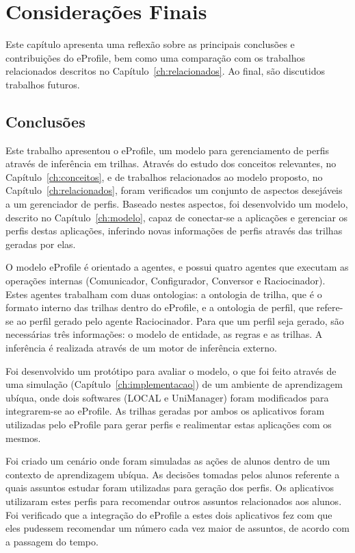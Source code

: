 \chapter{Considerações Finais}
\label{ch:consideracoes}

Este capítulo apresenta uma reflexão sobre as principais conclusões e contribuições do eProfile, bem como uma comparação com os trabalhos relacionados descritos no Capítulo~\ref{ch:relacionados}. Ao final, são discutidos trabalhos futuros.


\section{Conclusões}
\label{sec:conclusoes}

Este trabalho apresentou o eProfile, um modelo para gerenciamento de perfis através de inferência em trilhas. Através do estudo dos conceitos relevantes, no Capítulo~\ref{ch:conceitos}, e de trabalhos relacionados ao modelo proposto, no Capítulo~\ref{ch:relacionados}, foram verificados um conjunto de aspectos desejáveis a um gerenciador de perfis. Baseado nestes aspectos, foi desenvolvido um modelo, descrito no Capítulo~\ref{ch:modelo}, capaz de conectar-se a aplicações e gerenciar os perfis destas aplicações, inferindo novas informações de perfis através das trilhas geradas por elas.

O modelo eProfile é orientado a agentes, e possui quatro agentes que executam as operações internas (Comunicador, Configurador, Conversor e Raciocinador). Estes agentes trabalham com duas ontologias: a ontologia de trilha, que é o formato interno das trilhas dentro do eProfile, e a ontologia de perfil, que refere-se ao perfil gerado pelo agente Raciocinador. Para que um perfil seja gerado, são necessárias três informações: o modelo de entidade, as regras e as trilhas. A inferência é realizada através de um motor de inferência externo.

Foi desenvolvido um protótipo para avaliar o modelo, o que foi feito através de uma simulação (Capítulo~\ref{ch:implementacao}) de um ambiente de aprendizagem ubíqua, onde dois softwares (LOCAL e UniManager) foram modificados para integrarem-se ao eProfile. As trilhas geradas por ambos os aplicativos foram utilizadas pelo eProfile para gerar perfis e realimentar estas aplicações com os mesmos.

Foi criado um cenário onde foram simuladas as ações de alunos dentro de um contexto de aprendizagem ubíqua. As decisões tomadas pelos alunos referente a quais assuntos estudar foram utilizadas para geração dos perfis. Os aplicativos utilizaram estes perfis para recomendar outros assuntos relacionados aos alunos. Foi verificado que a integração do eProfile a estes dois aplicativos fez com que eles pudessem recomendar um número cada vez maior de assuntos, de acordo com a passagem do tempo.

